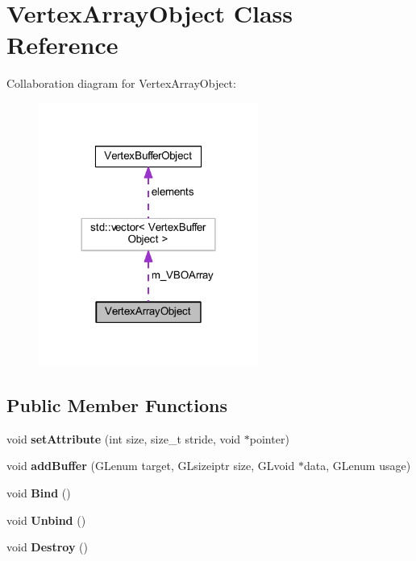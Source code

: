\hypertarget{class_vertex_array_object}{}\section{Vertex\+Array\+Object Class Reference}
\label{class_vertex_array_object}


Collaboration diagram for Vertex\+Array\+Object\+:
\nopagebreak
\begin{figure}[H]
\begin{center}
\leavevmode
\includegraphics[width=204pt]{class_vertex_array_object__coll__graph}
\end{center}
\end{figure}
\subsection*{Public Member Functions}
\begin{DoxyCompactItemize}
\item 
void {\bfseries set\+Attribute} (int size, size\+\_\+t stride, void $\ast$pointer)\hypertarget{class_vertex_array_object_ab6df1a12b540eecc411fa357e3e9ce73}{}\label{class_vertex_array_object_ab6df1a12b540eecc411fa357e3e9ce73}

\item 
void {\bfseries add\+Buffer} (G\+Lenum target, G\+Lsizeiptr size, G\+Lvoid $\ast$data, G\+Lenum usage)\hypertarget{class_vertex_array_object_a45afbe5b1dcaacf9b88333ae18246dba}{}\label{class_vertex_array_object_a45afbe5b1dcaacf9b88333ae18246dba}

\item 
void {\bfseries Bind} ()\hypertarget{class_vertex_array_object_a0bf6f6b7c6b22943bfe18a172c6c19fa}{}\label{class_vertex_array_object_a0bf6f6b7c6b22943bfe18a172c6c19fa}

\item 
void {\bfseries Unbind} ()\hypertarget{class_vertex_array_object_a330c0c1f4f4e74a6212e60066d0d25ff}{}\label{class_vertex_array_object_a330c0c1f4f4e74a6212e60066d0d25ff}

\item 
void {\bfseries Destroy} ()\hypertarget{class_vertex_array_object_aa743c7f294fe5021343ca53b1509ec87}{}\label{class_vertex_array_object_aa743c7f294fe5021343ca53b1509ec87}

\end{DoxyCompactItemize}
